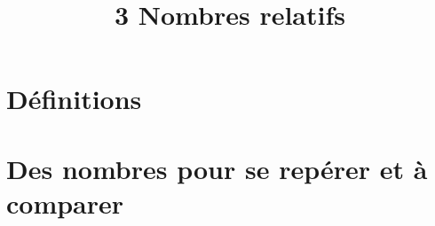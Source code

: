 \documentclass[12pt,a4paper]{article}
\date{}
\title{\textcircled{{\normalsize{3}}} Nombres relatifs}
\begin{document}
	
	\maketitle



\section{Définitions}



\newpage
\section{Des nombres pour se repérer et à comparer}



% 
%
%
%
%
%
%
\end{document}
